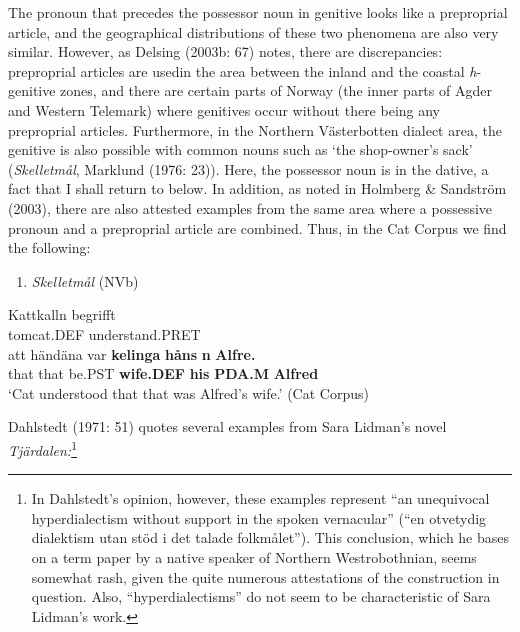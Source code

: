 The pronoun that precedes the possessor noun in genitive looks like a preproprial article, and the geographical distributions of these two phenomena are also very similar. However, as Delsing (2003b: 67) notes, there are discrepancies: preproprial articles are used\textstyleLinguisticExample{ }in the area between the inland and the coastal \textit{h}{}-genitive zones, and there are certain parts of Norway (the inner parts of Agder and Western Telemark) where genitives occur without there being any preproprial articles. Furthermore, in the Northern Västerbotten dialect area, the genitive is also possible with common nouns such as  ‘the shop-owner’s sack’ (\textit{Skelletmål}, Marklund (1976: 23)). Here, the possessor noun is in the dative, a fact that I shall return to below. In addition, as noted in Holmberg \& Sandström (2003), there are also attested examples from the same area where a possessive pronoun and a preproprial article are combined. Thus, in the Cat Corpus we find the following:

\begin{enumerate} %
\item 
\textit{Skelletmål} (NVb)
\end{enumerate} %
\ea\label{}
\gll Kattkalln  begrifft\\


tomcat.DEF  understand.PRET\\ %


\ea\label{}
\gll att  händäna  var  \textbf{kelinga}\textbf{  håns}\textbf{  n}\textbf{  Alfre.}\\


that  that  be.PST  \textbf{wife.DEF} \textbf{his} \textbf{PDA.M} \textbf{Alfred}\\ %


 ‘Cat understood that that was Alfred’s wife.’ (Cat Corpus)
\z


Dahlstedt (1971: 51) quotes several examples from Sara Lidman’s novel \textit{Tjärdalen}\textit{:}\footnote{ In Dahlstedt’s opinion, however, these examples represent “an unequivocal hyperdialectism without support in the spoken vernacular” (“en otvetydig dialektism utan stöd i det talade folkmålet”). This conclusion, which he bases on a term paper by a native speaker of Northern Westrobothnian, seems somewhat rash, given the quite numerous attestations of the construction in question. Also, “hyperdialectisms” do not seem to be characteristic of Sara Lidman’s work.\par }

